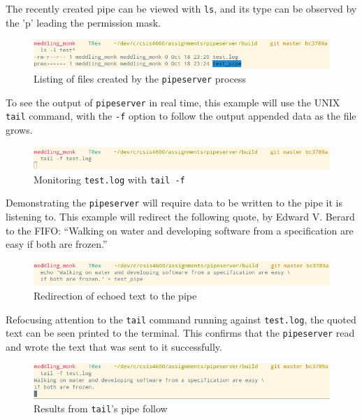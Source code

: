 \documentclass[letter,12pt,sffamily]{article}
\begin{document}
The recently created pipe can be viewed with \texttt{ls}, and its type can be observed by the 'p' leading the permission mask. 
\begin{figure}[H]
	\centering
	\includegraphics[width=1\linewidth]{./images/8}
	\caption[created_files_listing]{Listing of files created by the \texttt{pipeserver} process}
	\label{fig:8}
\end{figure}
To see the output of \texttt{pipeserver} in real time, this example will use the UNIX \texttt{tail} command, with the \texttt{-f} option to follow the output appended data as the file grows.
\begin{figure}[H]
	\centering
	\includegraphics[width=1\linewidth]{./images/9}
	\caption[tailf]{Monitoring \texttt{test.log} with \texttt{tail -f}}
	\label{fig:9}
\end{figure}
Demonstrating the \texttt{pipeserver} will require data to be written to the pipe it is listening to. This example will redirect the following quote, by Edward V. Berard to the FIFO:
\enquote{Walking on water and developing software from a specification are easy if both are frozen.}
\begin{figure}[H]
	\centering
	\includegraphics[width=1\linewidth]{./images/10}
	\caption[text_redirection]{Redirection of echoed text to the pipe}
	\label{fig:10}
\end{figure}
Refocusing attention to the \texttt{tail} command running against \texttt{test.log}, the quoted text can be seen printed to the terminal. This confirms that the \texttt{pipeserver} read and wrote the text
that was sent to it successfully.
\begin{figure}[H]
	\centering
	\includegraphics[width=1\linewidth]{./images/11}
	\caption[tail_pipe_follow]{Results from \texttt{tail}'s pipe follow}
	\label{fig:11}
\end{figure}
\end{document}
